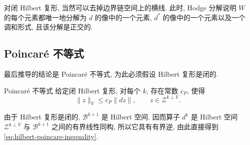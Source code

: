 {对闭 Hilbert 复形, 当然可以去掉边界链空间上的横线. 此时, Hodge 分解说明 $W$ 的每个元素都唯一地分解为 $d$ 的像中的一个元素, $d^*$ 的像中的一个元素以及一个调和形式, 且该分解是正交的.}

\subsection{Poincaré {不等式}}\label{subsec:hilbert-poincare-inequality}

{最后推导的结论是 Poincaré 不等式, 为此必须假设 Hilbert 复形是闭的.}


\begin{Theorem}{Poincaré {不等式}}\label{thm:hilbert-complex-poincare}
{给定闭 Hilbert 复形, 对每个 $k$, 存在常数 $c_P$, 使得}
\begin{equation}\label{eq:hilbert-poincare-inequality}
\|z\|_V\leq c_P\|dz\|,\qquad z\in\mathcal Z^{k\perp V}.
\end{equation}
\end{Theorem}

\begin{Proof}
{由于 Hilbert 复形是闭的, $\mathcal B^{k+1}$ 是 Hilbert 空间. 因而算子 $d^k$ 是 Hilbert 空间 $\mathcal Z^{k\perp V}$ 与 $\mathcal B^{k+1}$ 之间的有界线性同构, 所以它具有有界逆, 由此直接得到 \eqref{eq:hilbert-poincare-inequality}.}
\end{Proof}
